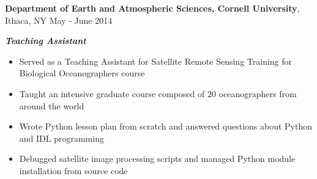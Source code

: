 
\textbf{Department of Earth and Atmospheric Sciences, Cornell University}, Ithaca, NY \hfill May - June 2014

\textbf{\textit{Teaching Assistant}}

\begin{itemize}
    \item Served as a Teaching Assistant for Satellite Remote Sensing Training for Biological Oceanographers course
    \item Taught an intensive graduate course composed of 20 oceanographers from around the world
    \item Wrote Python lesson plan from scratch and answered questions about Python and IDL programming
    \item Debugged satellite image processing scripts and managed Python module installation from source code
\end{itemize}
